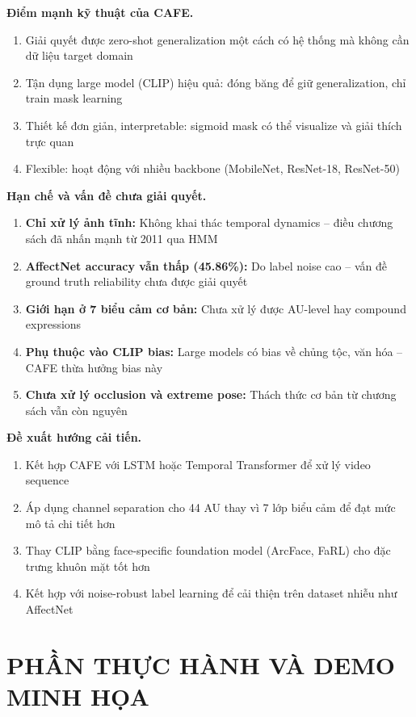 \documentclass[12pt,a4paper]{article}
\let\oldtextbf\textbf
\renewcommand{\textbf}[1]{\oldtextbf{\textcolor{hcmublue}{#1}}}
\begin{document}
\textbf{Điểm mạnh kỹ thuật của CAFE.}
\begin{enumerate}
    \item Giải quyết được zero-shot generalization một cách có hệ thống mà không cần dữ liệu target domain
    \item Tận dụng large model (CLIP) hiệu quả: đóng băng để giữ generalization, chỉ train mask learning
    \item Thiết kế đơn giản, interpretable: sigmoid mask có thể visualize và giải thích trực quan
    \item Flexible: hoạt động với nhiều backbone (MobileNet, ResNet-18, ResNet-50)
\end{enumerate}

\textbf{Hạn chế và vấn đề chưa giải quyết.}
\begin{enumerate}
    \item \textbf{Chỉ xử lý ảnh tĩnh:} Không khai thác temporal dynamics -- điều chương sách đã nhấn mạnh từ 2011 qua HMM
    \item \textbf{AffectNet accuracy vẫn thấp (45.86\%):} Do label noise cao -- vấn đề ground truth reliability chưa được giải quyết
    \item \textbf{Giới hạn ở 7 biểu cảm cơ bản:} Chưa xử lý được AU-level hay compound expressions
    \item \textbf{Phụ thuộc vào CLIP bias:} Large models có bias về chủng tộc, văn hóa -- CAFE thừa hưởng bias này
    \item \textbf{Chưa xử lý occlusion và extreme pose:} Thách thức cơ bản từ chương sách vẫn còn nguyên
\end{enumerate}

\textbf{Đề xuất hướng cải tiến.}
\begin{enumerate}
    \item Kết hợp CAFE với LSTM hoặc Temporal Transformer để xử lý video sequence
    \item Áp dụng channel separation cho 44 AU thay vì 7 lớp biểu cảm để đạt mức mô tả chi tiết hơn
    \item Thay CLIP bằng face-specific foundation model (ArcFace, FaRL) cho đặc trưng khuôn mặt tốt hơn
    \item Kết hợp với noise-robust label learning để cải thiện trên dataset nhiễu như AffectNet
\end{enumerate}

\section{PHẦN THỰC HÀNH VÀ DEMO MINH HỌA}
\end{document}
